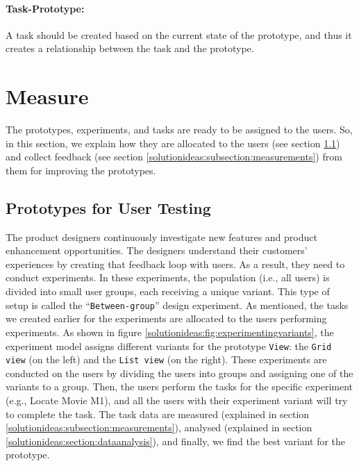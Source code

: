\paragraph{Task-Prototype:} A task should be created based on the current state of the prototype, and thus it creates a relationship between the task and the prototype.


\section{Measure}
The prototypes, experiments, and tasks are ready to be assigned to the users. 
So, in this section, we explain how they are allocated to the users (see section \ref{solutionideas:subsection:usertesting}) and collect feedback (see section \ref{solutionideas:subsection:measurements}) from them for improving the prototypes.

\subsection{Prototypes for User Testing}
\label{solutionideas:subsection:usertesting}

The product designers continuously investigate new features and product enhancement opportunities. 
The designers understand their customers' experiences by creating that feedback loop with users. 
As a result, they need to conduct experiments.
In these experiments, the population (i.e., all users) is divided into small user groups, each receiving a unique variant. 
This type of setup is called the ``\texttt{Between-group}'' design experiment. 
As mentioned, the tasks we created earlier for the experiments are allocated to the users performing experiments.
As shown in figure \ref{solutionideas:fig:experimentingvariants}, the experiment model assigns different variants for the prototype \texttt{View}: the \texttt{Grid view} (on the left) and the \texttt{List view} (on the right). 
These experiments are conducted on the users by dividing the users into groups and assigning one of the variants to a group. 
Then, the users perform the tasks for the specific experiment (e.g., Locate Movie M1), and all the users with their experiment variant will try to complete the task.
The task data are measured (explained in section \ref{solutionideas:subsection:measurements}), analysed (explained in section \ref{solutionideas:section:dataanalysis}), and finally, we find the best variant for the prototype.

